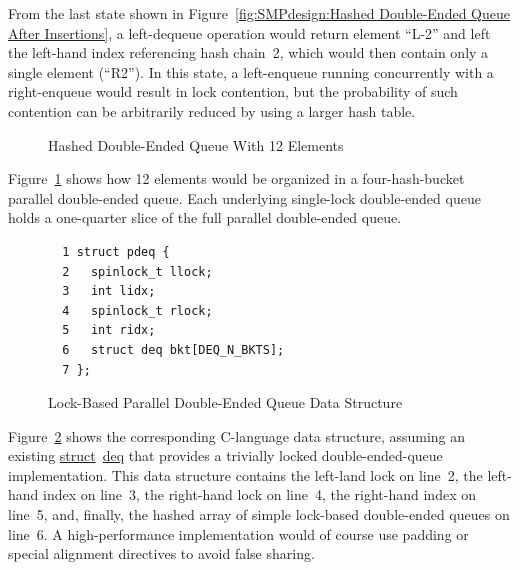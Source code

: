 From the last state shown in
Figure~\ref{fig:SMPdesign:Hashed Double-Ended Queue After Insertions},
a left-dequeue operation would return element ``L-2'' and left
the left-hand index referencing hash chain~2, which would then
contain only a single element (``R2'').
In this state, a left-enqueue running concurrently with a right-enqueue
would result in lock contention, but the probability of such contention
can be arbitrarily reduced by using a larger hash table.

\begin{figure}[tb]
\begin{center}
\end{center}
\caption{Hashed Double-Ended Queue With 12 Elements}
\label{fig:SMPdesign:Hashed Double-Ended Queue With 12 Elements}
\end{figure}

Figure~\ref{fig:SMPdesign:Hashed Double-Ended Queue With 12 Elements}
shows how 12 elements would be organized in a four-hash-bucket
parallel double-ended queue.
Each underlying single-lock double-ended queue holds a one-quarter
slice of the full parallel double-ended queue.

\begin{figure}[tbp]
{ \scriptsize
\begin{verbatim}
  1 struct pdeq {
  2   spinlock_t llock;
  3   int lidx;
  4   spinlock_t rlock;
  5   int ridx;
  6   struct deq bkt[DEQ_N_BKTS];
  7 };
\end{verbatim}
}
\caption{Lock-Based Parallel Double-Ended Queue Data Structure}
\label{fig:SMPdesign:Lock-Based Parallel Double-Ended Queue Data Structure}
\end{figure}

Figure~\ref{fig:SMPdesign:Lock-Based Parallel Double-Ended Queue Data Structure}
shows the corresponding C-language data structure, assuming an
existing \url{struct}~\url{deq} that provides a trivially locked
double-ended-queue implementation.
This data structure contains the left-land lock on line~2,
the left-hand index on line~3, the right-hand lock on line~4,
the right-hand index on line~5, and, finally, the hashed array
of simple lock-based double-ended queues on line~6.
A high-performance implementation would of course use padding or special
alignment directives to avoid false sharing.

